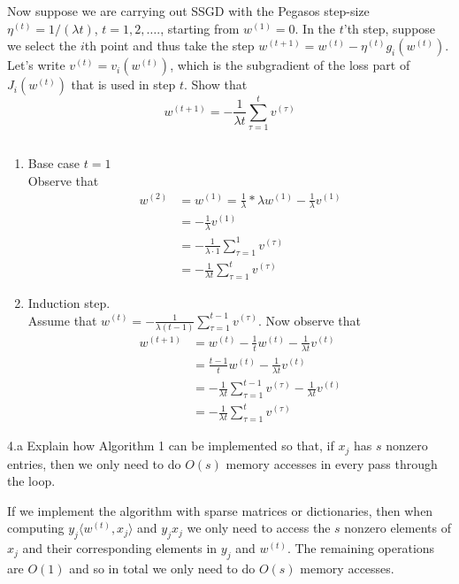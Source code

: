 \documentclass[12pt,letterpaper]{article}
\begin{document}
\begin{problem}{4.3}
Now suppose we are carrying out SSGD with the Pegasos
step-size $\eta^{(t)}=1/\left(\lambda t\right)$, $t=1,2,\ldots$.,
starting from $w^{(1)}=0$. In the $t$'th step, suppose we select
the $i$th point and thus take the step $w^{(t+1)}=w^{(t)}-\eta^{(t)}g_{i}(w^{(t)})$.
Let's write $v^{(t)}=v_{i}(w^{(t)})$, which is the subgradient of
the loss part of $J_{i}(w^{(t)})$ that is used in step $t$. Show
that
\[
w^{(t+1)}=-\frac{1}{\lambda t}\sum_{\tau=1}^{t}v^{(\tau)}
\]
\end{problem}
\begin{solution}{}
$\,$
    \begin{enumerate}
        \item Base case $t=1$\\
            Observe that
            \begin{align*}
                w^{(2)} &= w^{(1)} = \frac{1}{\lambda} * \lambda w^{(1)} - \frac{1}{\lambda} v^{(1)} \\
                &=  - \frac{1}{\lambda} v^{(1)}\\
                &=  - \frac{1}{\lambda \cdot 1} \sum_{\tau=1}^1 v^{(\tau)}\\
                &= - \frac{1}{\lambda t} \sum_{\tau=1}^t v^{(\tau)}
            \end{align*}
        
        \item Induction step.\\
            Assume that $w^{(t)}=-\frac{1}{\lambda (t-1)}\sum_{\tau=1}^{t-1}v^{(\tau)}$. Now observe that
            \begin{align*}
                w^{(t+1)} &= w^{(t)} - \frac{1}{t}w^{(t)} - \frac{1}{\lambda t}v^{(t)}\\
                &= \frac{t-1}{t}w^{(t)} - \frac{1}{\lambda t} v^{(t)}\\
                &= -\frac{1}{\lambda t} \sum_{\tau=1}^{t-1}v^{(\tau)} - \frac{1}{\lambda t}v^{(t)}\\
                &= -\frac{1}{\lambda t} \sum_{\tau=1}^{t}v^{(\tau)}
            \end{align*}
    \end{enumerate}
\end{solution}
\newpage

\begin{problem}{4.a}
Explain how Algorithm 1 can be implemented so that, if
$x_{j}$ has $s$ nonzero entries, then we only need to do $O(s)$
memory accesses in every pass through the loop.
\end{problem}
\begin{solution}{}
    If we implement the algorithm with sparse matrices or dictionaries, then when computing $y_j\langle w^{(t)}, x_j \rangle$
    and $y_jx_j$ we only need to access the $s$ nonzero elements of $x_j$ and their corresponding elements in $y_j$ and $w^{(t)}$.
    The remaining operations are $O(1)$ and so in total we only need to do $O(s)$ memory accesses.
\end{solution}
\end{document}
